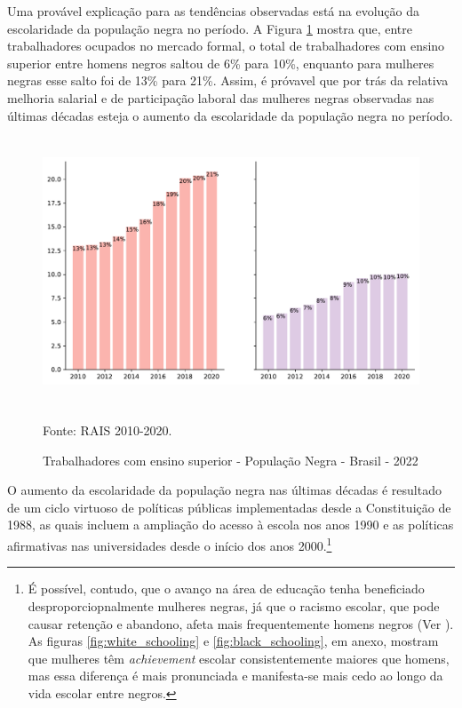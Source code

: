 \documentclass[12pt]{article}
\begin{document}
\par Uma provável explicação para as tendências observadas está na evolução da escolaridade da população negra no período. A Figura \ref{fig:rais_schooling} mostra que, entre trabalhadores ocupados no mercado formal, o total de trabalhadores com ensino superior entre homens negros saltou de 6\% para 10\%, enquanto para mulheres negras esse salto foi de 13\% para 21\%. Assim, é próvavel que por trás da relativa melhoria salarial e de participação laboral das mulheres negras observadas nas últimas décadas esteja o aumento da escolaridade da população negra no período.

% 
% 

\begin{figure}[H]
    \centering
    \caption{Trabalhadores com ensino superior - População Negra - Brasil - 2022}
        \includegraphics[height=8cm]{../figures/rais_schooling.pdf}
    \label{fig:rais_schooling}
    \begin{floatnotes}
        \item[Fonte:] RAIS 2010-2020.
    \end{floatnotes}
\end{figure}

\par O aumento da escolaridade da população negra nas últimas décadas é resultado de um ciclo virtuoso de políticas públicas implementadas desde a Constituição de 1988, as quais incluem a ampliação do acesso à escola nos anos 1990 e as políticas afirmativas nas universidades desde o início dos anos 2000.\footnote{É possível, contudo, que o avanço na área de educação tenha beneficiado desproporciopnalmente mulheres negras, já que o racismo escolar, que pode causar retenção e abandono, afeta mais frequentemente homens negros (Ver \autocite{carvalho2004fracasso}). As figuras \ref{fig:white_schooling} e \ref{fig:black_schooling}, em anexo, mostram que mulheres têm \textit{achievement} escolar consistentemente maiores que homens, mas essa diferença é mais pronunciada e manifesta-se mais cedo ao longo da vida escolar entre negros.}
\end{document}
